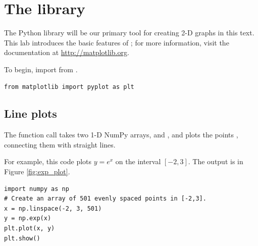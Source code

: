 \label{lab:Matplotlib_and_Mayavi}

\section*{The  library}
The Python library  will be our primary tool for creating 2-D graphs in this text. This lab introduces the basic features of ; for more information, visit the documentation at \url{http://matplotlib.org}.

To begin, import  from .
\begin{lstlisting}
from matplotlib import pyplot as plt
\end{lstlisting}

\subsection*{Line plots}
The function call  takes two 1-D NumPy arrays,  and , and plots the points , connecting them with straight lines.

For example, this code plots $y=e^x$ on the interval $[-2,3]$. The output is in Figure \ref{fig:exp_plot}.
\begin{lstlisting}
import numpy as np
# Create an array of 501 evenly spaced points in [-2,3].
x = np.linspace(-2, 3, 501)
y = np.exp(x)
plt.plot(x, y)
plt.show()
\end{lstlisting}


